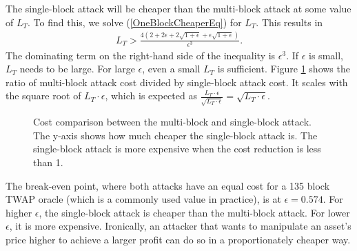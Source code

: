 \documentclass[conference]{IEEEtran}
\begin{document}
The single-block attack will be cheaper than the multi-block attack at some value of $L_T$. To find this, we solve (\ref{OneBlockCheaperEq}) for $L_T$. This results in
\begin{align*}
    L_T > \frac{4 (2+2 \epsilon+2 \sqrt{1+\epsilon}+\epsilon \sqrt{1+\epsilon})}{\epsilon^3}.
\end{align*}
The dominating term on the right-hand side of the inequality is $\epsilon^3$. If $\epsilon$ is small, $L_T$ needs to be large. For large $\epsilon$, even a small $L_T$ is sufficient. Figure \ref{figureCostDiff} shows the ratio of multi-block attack cost divided by single-block attack cost. It scales with the square root of $L_T \cdot \epsilon$, which is expected as $\frac{L_T \cdot \epsilon}{\sqrt{L_T \cdot \epsilon}} = \sqrt{L_T \cdot \epsilon}$.

\begin{figure}[h]
\caption{Cost comparison between the multi-block and single-block attack. The y-axis shows how much cheaper the single-block attack is. The single-block attack is more expensive when the cost reduction is less than 1.}
\label{figureCostDiff}
\end{figure}

The break-even point, where both attacks have an equal cost for a 135 block TWAP oracle (which is a commonly used value in practice), is at $\epsilon = 0.574$. For higher $\epsilon$, the single-block attack is cheaper than the multi-block attack. For lower $\epsilon$, it is more expensive. Ironically, an attacker that wants to manipulate an asset's price higher to achieve a larger profit can do so in a proportionately cheaper way.
\end{document}
